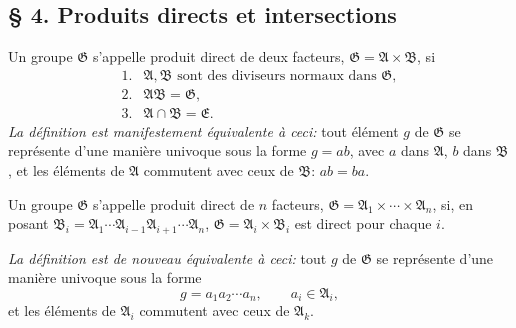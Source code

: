 
\providecommand{\mG}{\mathfrak{G}}
\providecommand{\mA}{\mathfrak{A}}
\providecommand{\mB}{\mathfrak{B}}
\providecommand{\mC}{\mathfrak{C}}
\providecommand{\mD}{\mathfrak{D}}
\providecommand{\mE}{\mathfrak{E}}
\providecommand{\mH}{\mathfrak{H}}
\providecommand{\mR}{\mathfrak{R}}
\providecommand{\mS}{\mathfrak{S}}
\providecommand{\mT}{\mathfrak{T}}

\subsection*{\S{} 4. Produits directs et intersections}

Un groupe $\mG$ s'appelle produit direct de deux facteurs, $\mG=\mA\times\mB$, si
\[
\begin{array}{ll}
1.& \mA,\mB\text{ sont des diviseurs normaux dans }\mG,\\
2.& \mA\mB=\mG,\\
3.& \mA\cap\mB=\mE.
\end{array}
\]
\emph{La définition est manifestement équivalente à ceci:} tout élément $g$ de $\mG$ se représente d'une manière univoque sous la forme $g=ab$, avec $a$ dans $\mA$, $b$ dans $\mB$, et les éléments de $\mA$ commutent avec ceux de $\mB$: $ab=ba$.

Un groupe $\mG$ s'appelle produit direct de $n$ facteurs, $\mG=\mA_1\times\cdots\times\mA_n$, si, en posant $\mB_i=\mA_1\cdots\mA_{i-1}\mA_{i+1}\cdots\mA_n$, $\mG=\mA_i\times\mB_i$ est direct pour chaque $i$.

\emph{La définition est de nouveau équivalente à ceci:} tout $g$ de $\mG$ se représente d'une manière univoque sous la forme
\[
        g=a_1a_2\cdots a_n,\qquad a_i\in\mA_i,
\]
et les éléments de $\mA_i$ commutent avec ceux de $\mA_k$.

